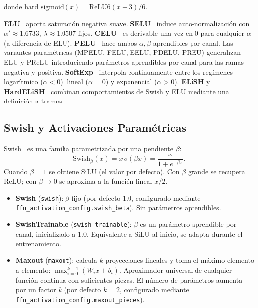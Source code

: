 \noindent donde $\text{hard\_sigmoid}(x)=\text{ReLU6}(x+3)/6$.

\noindent\textbf{ELU}~\citep{clevert2016elu} aporta saturación negativa suave.
\textbf{SELU}~\citep{klambauer2017selu} induce auto-normalización con
$\alpha'{\approx}1.6733$, $\lambda{\approx}1.0507$ fijos.
\textbf{CELU}~\citep{barron2017celu} es derivable una vez en 0 para cualquier
$\alpha$ (a diferencia de ELU). \textbf{PELU}~\citep{trottier2017pelu} hace
ambos $\alpha,\beta$ aprendibles por canal. Las variantes paramétricas
(MPELU, FELU, EELU, PDELU, PREU) generalizan ELU y PReLU introduciendo
parámetros aprendibles por canal para las ramas negativa y positiva.
\textbf{SoftExp}~\citep{godfrey2015softexp} interpola continuamente entre los
regímenes logarítmico ($\alpha<0$), lineal ($\alpha=0$) y exponencial
($\alpha>0$). \textbf{ELiSH} y \textbf{HardELiSH}~\citep{basirat2019elish}
combinan comportamientos de Swish y ELU mediante una definición a tramos.

\subsection{Swish y Activaciones Paramétricas}

Swish~\citep{ramachandran2017swish} es una familia parametrizada por una
pendiente $\beta$:
\[
  \text{Swish}_\beta(x) = x\,\sigma(\beta x) = \frac{x}{1+e^{-\beta x}}.
\]
Cuando $\beta=1$ se obtiene SiLU (el valor por defecto). Con $\beta$ grande se
recupera ReLU; con $\beta\to 0$ se aproxima a la función lineal $x/2$.

\begin{itemize}[leftmargin=*]
  \item \textbf{Swish} (\texttt{swish}): $\beta$ fijo (por defecto 1.0,
    configurado mediante \texttt{ffn\_activation\_config.swish\_beta}). Sin
    parámetros aprendibles.
  \item \textbf{SwishTrainable} (\texttt{swish\_trainable}): $\beta$ es un
    parámetro aprendible por canal, inicializado a 1.0. Equivalente a SiLU al
    inicio, se adapta durante el entrenamiento.
  \item \textbf{Maxout} (\texttt{maxout}): calcula $k$ proyecciones lineales y
    toma el máximo elemento a elemento: $\max_{i=0}^{k-1}(W_i x + b_i)$.
    Aproximador universal de cualquier función continua con suficientes piezas.
    El número de parámetros aumenta por un factor $k$ (por defecto $k=2$,
    configurado mediante \texttt{ffn\_activation\_config.maxout\_pieces}).
\end{itemize}

